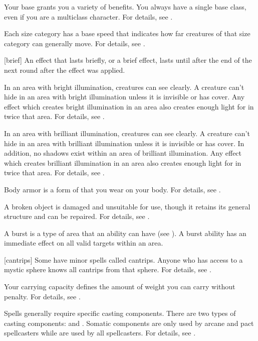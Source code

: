  Your base  grants you a variety of benefits.
You always have a single base class, even if you are a multiclass character.
For details, see .

 Each size category has a base speed that indicates how far creatures of that size category can generally move.
For details, see .

[brief] An effect that lasts briefly, or a brief effect, lasts until after the end of the next round after the effect was applied.

 In an area with bright illumination, creatures can see clearly.
A creature can't hide in an area with bright illumination unless it is invisible or has cover.
Any effect which creates bright illumination in an area also creates enough light for  in twice that area.
For details, see .

 In an area with brilliant illumination, creatures can see clearly.
A creature can't hide in an area with brilliant illumination unless it is invisible or has cover.
In addition, no shadows exist within an area of brilliant illumination.
Any effect which creates brilliant illumination in an area also creates enough light for  in twice that area.
For details, see .

 Body armor is a form of  that you wear on your body.
For details, see .

 A broken object is damaged and unsuitable for use, though it retains its general structure and can be repaired.
For details, see .

 A burst is a type of area that an ability can have (see ).
A burst ability has an immediate effect on all valid targets within an area.

[cantrips] Some  have minor spells called cantrips.
Anyone who has access to a mystic sphere knows all cantrips from that sphere.
For details, see .

 Your carrying capacity defines the amount of weight you can carry without penalty.
For details, see .

 Spells generally require specific casting components.
There are two types of casting components:  and .
Somatic components are only used by arcane and pact spellcasters while  are used by all spellcasters.
For details, see .

